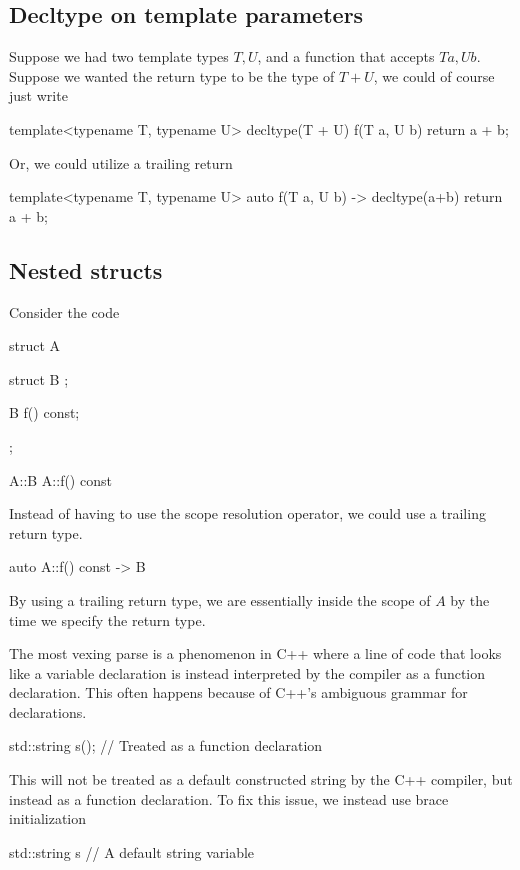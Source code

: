 \documentclass{report}
\begin{document}
    \pagebreak 
    \bigbreak \noindent 
    \subsection{Decltype on template parameters}
    \bigbreak \noindent 
    Suppose we had two template types $T,U$, and a function that accepts $T a, U b$. Suppose we wanted the return type to be the type of $T + U$, we could of course just write
    \bigbreak \noindent 
    \begin{cppcode}
        template<typename T, typename U>
        decltype(T{} + U{}) f(T a, U b) {
            return a + b; 
        }
    \end{cppcode}
    \bigbreak \noindent 
    Or, we could utilize a trailing return
    \bigbreak \noindent 
    \begin{cppcode}
    template<typename T, typename U>
    auto f(T a, U b) -> decltype(a+b) {
        return a + b; 
    }
    \end{cppcode}
    \bigbreak \noindent 
    \subsection{Nested structs}
    \bigbreak \noindent 
    Consider the code
    \bigbreak \noindent 
    \begin{cppcode}
        struct A {
            struct B {};

            B f() const;
        };

        A::B A::f() const { }
    \end{cppcode}
    \bigbreak \noindent 
    Instead of having to use the scope resolution operator, we could use a trailing return type.
    \bigbreak \noindent 
    \begin{cppcode}
        auto A::f() const -> B {

        }
    \end{cppcode}
    \bigbreak \noindent 
    By using a trailing return type, we are essentially inside the scope of $A$ by the time we specify the return type.

    \pagebreak 
    \bigbreak \noindent 
    The most vexing parse is a phenomenon in C++ where a line of code that looks like a variable declaration is instead interpreted by the compiler as a function declaration. This often happens because of C++'s ambiguous grammar for declarations.
    \bigbreak \noindent 
    \begin{cppcode}
    std::string s(); // Treated as a function declaration
    \end{cppcode}
    \bigbreak \noindent 
    This will not be treated as a default constructed string by the C++ compiler, but instead as a function declaration. To fix this issue, we instead use brace initialization
    \bigbreak \noindent 
    \begin{cppcode}
        std::string s{} // A default string variable
    \end{cppcode}
\end{document}
